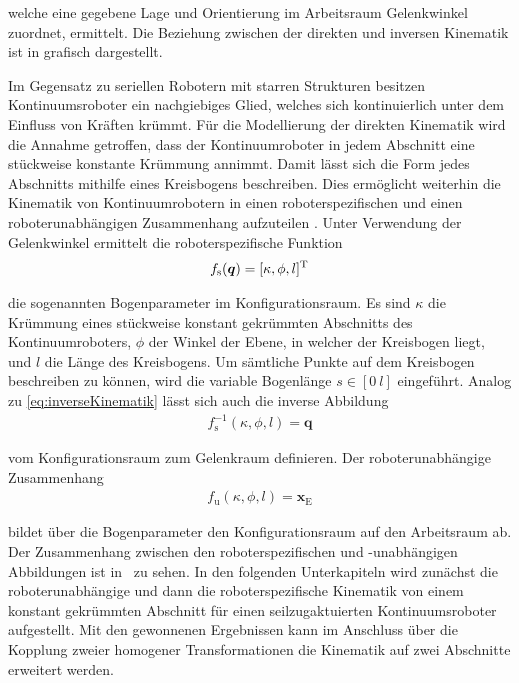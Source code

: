 welche eine gegebene Lage und Orientierung im Arbeitsraum Gelenkwinkel zuordnet, ermittelt. Die Beziehung zwischen der direkten und inversen Kinematik ist in  grafisch dargestellt. 

Im Gegensatz zu seriellen Robotern mit starren Strukturen besitzen Kontinuumsroboter ein nachgiebiges Glied, welches sich kontinuierlich unter dem Einfluss von Kräften krümmt. Für die Modellierung der direkten Kinematik wird die Annahme getroffen, dass der Kontinuumroboter in jedem Abschnitt eine stückweise konstante Krümmung annimmt. Damit lässt sich die Form jedes Abschnitts mithilfe eines Kreisbogens beschreiben. Dies ermöglicht weiterhin die Kinematik von Kontinuumrobotern in einen roboterspezifischen und einen roboterunabhängigen Zusammenhang aufzuteilen \cite{WIJ10}. Unter Verwendung der Gelenkwinkel ermittelt die roboterspezifische Funktion
%
\begin{align}
f_{\mathrm{s}}(\bm{q}) = [\kappa, \phi, l]^{\mathrm{T}}
\label{eq:fspezifisch}
\end{align}

die sogenannten Bogenparameter im Konfigurationsraum. Es sind $\kappa$ die Krümmung eines stückweise konstant gekrümmten Abschnitts des Kontinuumroboters, $\phi$ der Winkel der Ebene, in welcher der Kreisbogen liegt, und $l$ die Länge des Kreisbogens. Um sämtliche Punkte auf dem Kreisbogen beschreiben zu können, wird die variable Bogenlänge $s \in [0~l]$ eingeführt. Analog zu \eqref{eq:inverseKinematik} lässt sich auch die inverse Abbildung
%
\begin{align}
f^{-1}_{\mathrm{s}}(\kappa, \phi, l) = \bm{q}
\label{eq:fspezifischinvers}
\end{align}

vom Konfigurationsraum zum Gelenkraum definieren. Der roboterunabhängige Zusammenhang 
%
\begin{align}
f_{\text{u}}(\kappa, \phi, l) = \bm{x}_\mathrm{E}
\label{eq:funabhängig}
\end{align}

bildet über die Bogenparameter den Konfigurationsraum auf den Arbeitsraum ab. Der Zusammenhang zwischen den roboterspezifischen und -unabhängigen Abbildungen ist in~ zu sehen. In den folgenden Unterkapiteln wird zunächst die roboterunabhängige und dann die roboterspezifische Kinematik von einem konstant gekrümmten Abschnitt für einen seilzugaktuierten Kontinuumsroboter aufgestellt. Mit den gewonnenen Ergebnissen kann im Anschluss über die Kopplung zweier homogener Transformationen die Kinematik auf zwei Abschnitte erweitert werden. \\

